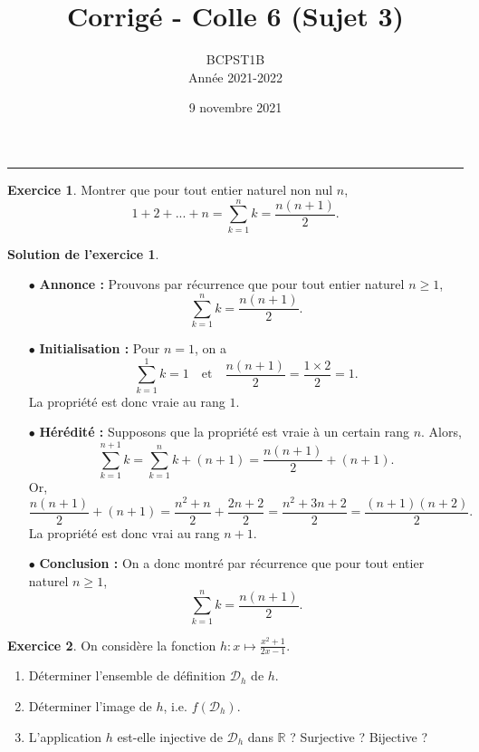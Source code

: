 \documentclass[a4paper, 11pt,openany]{article}%
\title{Corrigé - Colle 6 (Sujet 3)}
\author{BCPST1B\\
Année 2021-2022}
\date{9 novembre 2021}
\theoremstyle{plain}
\theoremstyle{definition}
\newtheorem{exo}{Exercice}
\newtheorem{sol}{Solution de l'exercice}
\theoremstyle{remark}
\newcommand{\R}{\mathbb{R}}
\newcommand{\calD}{\mathcal{D}}
\begin{document}
   \maketitle
      \rule{\linewidth}{0.5mm}


\begin{exo}
Montrer que pour tout entier naturel non nul $n$,
\[ 1 + 2 + ... + n = \sum_{k=1}^n k = \frac{n(n+1)}{2}.\]
\end{exo}

\begin{sol}
 \begin{itemize}
\item[$\bullet$] \textbf{Annonce :} Prouvons par récurrence que pour tout entier naturel $n \geqslant 1$, 
\[ \sum_{k=1}^n k = \frac{n(n+1)}{2}.\]
\item[$\bullet$] \textbf{Initialisation :} Pour $n = 1$, on a
\[ \sum_{k=1}^1 k = 1 \quad \text{et} \quad \frac{n(n+1)}{2} = \frac{1 \times 2 }{2} = 1.\]
La propriété est donc vraie au rang $1$.
\item[$\bullet$] \textbf{Hérédité :} Supposons que la propriété est vraie à un certain rang $n$. Alors,
\[ \sum_{k=1}^{n+1} k  = \sum_{k=1}^n k + (n+1) = \frac{n(n+1)}{2} + (n+1).\]
Or,
\[  \frac{n(n+1)}{2} + (n+1) = \frac{n^2 + n}{2} + \frac{2n + 2 }{2 } =  \frac{n^2 + 3n + 2}{2} = \frac{(n+1)(n+2)}{2} .\]
La propriété est donc vrai au rang $n+1$.
\item[$\bullet$] \textbf{Conclusion :} On a donc montré par récurrence que pour tout entier naturel $n \geqslant 1$, 
\[ \sum_{k=1}^n k = \frac{n(n+1)}{2}.\]
\end{itemize}
\end{sol}


\begin{exo}
On considère la fonction 
$ h : x \mapsto \frac{x^2 +1}{2x - 1}$.
\begin{enumerate}
\item Déterminer l'ensemble de définition $\calD_h$ de $h$.
\item Déterminer l'image de $h$, i.e. $f(\calD_h)$.
\item L'application $h$ est-elle injective de $\calD_h$ dans $\R$ ? Surjective ? Bijective ?
\end{enumerate}
\end{exo}
\end{document}
